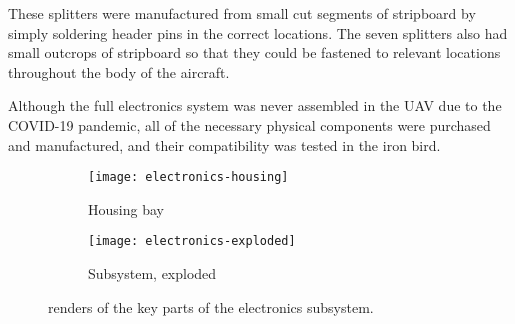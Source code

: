 \documentclass[../../main.tex]{subfiles}
\begin{document}
These splitters were manufactured from small cut segments of stripboard by simply soldering header pins in the correct locations.
The seven splitters also had small outcrops of stripboard so that they could be fastened to relevant locations throughout the body of the aircraft. 


Although the full electronics system was never assembled in the UAV due to the COVID-19 pandemic, all of the necessary physical components were purchased and manufactured, and their compatibility was tested in the iron bird. 


\begin{figure}[H]
    \centering
    \begin{subfigure}[b]{0.49\columnwidth}
        \centering
        \texttt{[image: electronics-housing]}
        \caption{Housing bay}
        \label{fig:electronics-subsystem:bay}
    \end{subfigure}
    \hfill
    \begin{subfigure}[b]{0.49\columnwidth}
        \centering
        \texttt{[image: electronics-exploded]}
        \caption{Subsystem, exploded}
        \label{fig:electronics-subsystem:exploded}
    \end{subfigure}
    
    \caption{renders of the key parts of the electronics subsystem.}
    \label{fig:electronics-subsystem}
\end{figure} 

\end{document}
